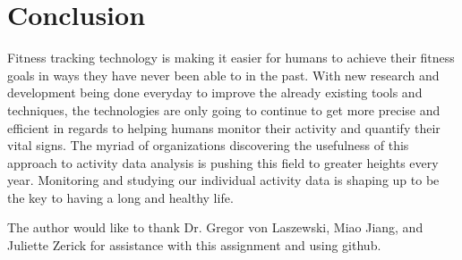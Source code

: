 \documentclass[sigconf]{acmart}
\begin{document}
\section{Conclusion}

Fitness tracking technology is making it easier for humans to achieve their fitness goals in ways they have never been able to in the past. With new research and development being done everyday to improve the already existing tools and techniques, the technologies are only going to continue to get more precise and efficient in regards to helping humans monitor their activity and quantify their vital signs. The myriad of organizations discovering the usefulness of this approach to activity data analysis is pushing this field to greater heights every year. Monitoring and studying our individual activity data is shaping up to be the key to having a long and healthy life.

\begin{acks}

  The author would like to thank Dr. Gregor von Laszewski, Miao Jiang, and Juliette Zerick for assistance with this assignment and using github.

\end{acks}



 
\end{document}
